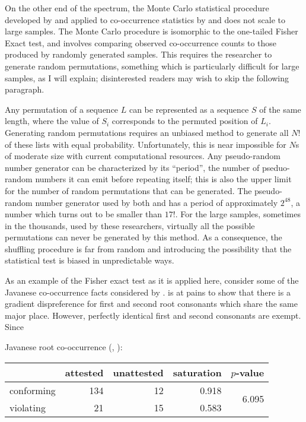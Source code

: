 On the other end of the spectrum, the Monte Carlo statistical procedure developed by \citet{Kessler2001} and applied to co-occurrence statistics by \citet{Martin2007,Martin2011} and \citet{Brown2010} does not scale to large samples. The Monte Carlo procedure is isomorphic to the one-tailed Fisher Exact test, and involves comparing observed co-occurrence counts to those produced by randomly generated samples.  This requires the researcher to generate random permutations, something which is particularly difficult for large samples, as I will explain; disinterested readers may wish to skip the following paragraph.

Any permutation of a sequence $L$ can be represented as a sequence $S$ of the same length, where the value of $S_i$ corresponds to the permuted position of $L_i$. Generating random permutations requires an unbiased method to generate all $N!$ of these lists with equal probability. Unfortunately, this is near impossible for $N$s of moderate size with current computational resources. Any pseudo-random number generator can be characterized by its ``period'', the number of pseduo-random numbers it can emit before repeating itself; this is also the upper limit for the number of random permutations that can be generated. The pseudo-random number generator used by both \citeauthor{Martin2011} and \citeauthor{Brown2010} has a period of approximately $2^{48}$, a number which turns out to be smaller than $17!$. For the large samples, sometimes in the thousands, used by these researchers, virtually all the possible permutations can never be generated by this method. As a consequence, the shuffling procedure is far from random and introducing the possibility that the statistical test is biased in unpredictable ways.

As an example of the Fisher exact test as it is applied here, consider some of the Javanese co-occurrence facts considered by \citet{Mester1988}. \citeauthor{Mester1988} is at pains to show that there is a gradient dispreference for first and second root consonants which share the same major place. However, perfectly identical first and second consonants are exempt. Since 



\ex Javanese root co-occurrence (\citealp[][264]{Uhlenbeck1950}, \citealp[][139]{Mester1988}): \vspace{6pt} \\
\begin{tabular}{l r r r r}
\toprule
           & attested & unattested & saturation & $p$-value \\
\midrule
conforming & 134      & 12         & 0.918      & \multirow{2}{*}{6.095\e{-06}} \\
violating  & 21       & 15         & 0.583 \\
\bottomrule
\end{tabular}
\xe

